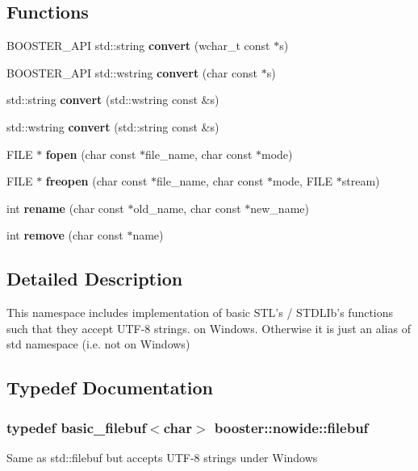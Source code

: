 \subsection*{\-Functions}
\begin{DoxyCompactItemize}
\item 
\-B\-O\-O\-S\-T\-E\-R\-\_\-\-A\-P\-I std\-::string {\bf convert} (wchar\-\_\-t const $\ast$s)
\item 
\-B\-O\-O\-S\-T\-E\-R\-\_\-\-A\-P\-I std\-::wstring {\bf convert} (char const $\ast$s)
\item 
std\-::string {\bf convert} (std\-::wstring const \&s)
\item 
std\-::wstring {\bf convert} (std\-::string const \&s)
\item 
\-F\-I\-L\-E $\ast$ {\bf fopen} (char const $\ast$file\-\_\-name, char const $\ast$mode)
\item 
\-F\-I\-L\-E $\ast$ {\bf freopen} (char const $\ast$file\-\_\-name, char const $\ast$mode, \-F\-I\-L\-E $\ast$stream)
\item 
int {\bf rename} (char const $\ast$old\-\_\-name, char const $\ast$new\-\_\-name)
\item 
int {\bf remove} (char const $\ast$name)
\end{DoxyCompactItemize}


\subsection{\-Detailed \-Description}
\-This namespace includes implementation of basic \-S\-T\-L's / \-S\-T\-D\-L\-Ib's functions such that they accept \-U\-T\-F-\/8 strings. on \-Windows. \-Otherwise it is just an alias of std namespace (i.\-e. not on \-Windows) 

\subsection{\-Typedef \-Documentation}
\subsubsection[{filebuf}]{\setlength{\rightskip}{0pt plus 5cm}typedef basic\-\_\-filebuf$<$char$>$ {\bf booster\-::nowide\-::filebuf}}\label{namespacebooster_1_1nowide_af9a3f7aff0f973ee8d6782afcc3e9093}
\-Same as std\-::filebuf but accepts \-U\-T\-F-\/8 strings under \-Windows 
